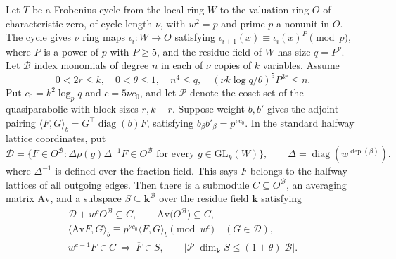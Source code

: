 \begin{lemma}
\label{lem:a-edge-condition}
\emitthmsource
Let $T$ be a Frobenius cycle from the local ring $W$ to the valuation ring $O$ of characteristic zero, of cycle length $\nu$, with $w^2=p$ and prime $p$ a nonunit in $O$. The cycle gives $\nu$ ring maps $\iota_i:W\to O$ satisfying $\iota_{i+1}(x)\equiv\iota_i(x)^P\pmod p$, where $P$ is a power of $p$ with $P\ge5$, and the residue field of $W$ has size $q=P^\nu$. Let $\mathcal B$ index monomials of degree $n$ in each of $\nu$ copies of $k$ variables. Assume
\[
 0<2r\le k,\quad 0<\theta\le1,\quad n^4\le q,\quad
 (\nu k\log q/\theta)^5 P^{3r}\le n .
\]
Put $c_0=k^2\log_p q$ and $c=5\nu c_0$, and let $\mathcal P$ denote the coset set of the quasiparabolic with block sizes $r,k-r$. Suppose weight $b,b'$ gives the adjoint pairing
\(\langle F,G\rangle_b=G^\top\operatorname{diag}(b)F\), satisfying $b_\beta b'_\beta=p^{\nu c_0}$. In the standard halfway lattice coordinates, put
\[
 \mathcal D=\{F\in O^{\mathcal B}:
       \Delta\rho(g)\Delta^{-1}F\in O^{\mathcal B}
            \text{ for every }g\in\mathrm{GL}_k(W)\},
 \qquad
 \Delta=\operatorname{diag}(w^{\operatorname{dep}(\beta)}).
\]
where $\Delta^{-1}$ is defined over the fraction field. This says $F$ belongs to the halfway lattices of all outgoing edges. Then there is a submodule $C\subseteq O^{\mathcal B}$, an averaging matrix $\mathrm{Av}$, and a subspace $S\subseteq\mathbf k^{\mathcal B}$ over the residue field $\mathbf k$ satisfying
\[
 \begin{gathered}
 \mathcal D+w^cO^{\mathcal B}\subseteq C,\qquad
 \mathrm{Av}\bigl(O^{\mathcal B}\bigr)\subseteq C,\\
 \langle \mathrm{Av}F,G\rangle_b
     \equiv p^{\nu c_0}\langle F,G\rangle_b \pmod{w^c}
          \quad (G\in\mathcal D),\\
 w^{c-1}F\in C\ \Longrightarrow\ \overline F\in S,\qquad
 |\mathcal P|\dim_\mathbf k S\le (1+\theta)|\mathcal B|.
 \end{gathered}
\]
\end{lemma}
